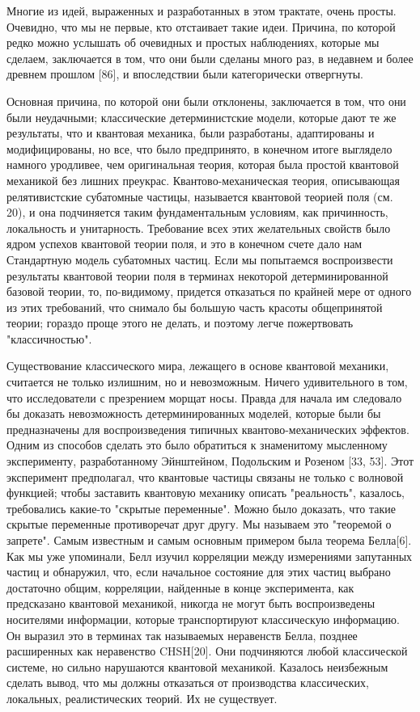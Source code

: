 \documentclass[main.tex]{subfiles}
\begin{document}
Многие из идей, выраженных и разработанных в этом трактате, очень просты. Очевидно, что мы не первые, кто отстаивает такие идеи. Причина, по которой редко можно услышать об очевидных и простых наблюдениях, которые мы сделаем, заключается в том, что они были сделаны много раз, в недавнем и более древнем прошлом [86], и впоследствии были категорически отвергнуты.

Основная причина, по которой они были отклонены, заключается в том, что они были неудачными; классические детерминистские модели, которые дают те же результаты, что и квантовая механика, были разработаны, адаптированы и модифицированы, но все, что было предпринято, в конечном итоге выглядело намного уродливее, чем оригинальная теория, которая была простой квантовой механикой без лишних преукрас. Квантово-механическая теория, описывающая релятивистские субатомные частицы, называется квантовой теорией поля (см. 20), и она подчиняется таким фундаментальным условиям, как причинность, локальность и унитарность. Требование всех этих желательных свойств было ядром успехов квантовой теории поля, и это в конечном счете дало нам Стандартную модель субатомных частиц. Если мы попытаемся воспроизвести результаты квантовой теории поля в терминах некоторой детерминированной базовой теории, то, по-видимому, придется отказаться по крайней мере от одного из этих требований, что снимало бы большую часть красоты общепринятой теории; гораздо проще этого не делать, и поэтому легче пожертвовать "классичностью". 

Существование классического мира, лежащего в основе квантовой механики, считается не только излишним, но и невозможным. Ничего удивительного в том, что исследователи с презрением морщат носы. Правда для начала им следовало бы доказать невозможность детерминированных моделей, которые были бы предназначены для воспроизведения типичных квантово-механических эффектов. Одним из способов сделать это было обратиться к знаменитому мысленному эксперименту, разработанному Эйнштейном, Подольским и Розеном [33, 53]. Этот эксперимент предполагал, что квантовые частицы связаны не только с волновой функцией; чтобы заставить квантовую механику описать "реальность", казалось, требовались какие-то "скрытые переменные". Можно было доказать, что такие скрытые переменные противоречат друг другу. Мы называем это "теоремой о запрете". Самым известным и самым основным примером была теорема Белла[6]. Как мы уже упоминали, Белл изучил корреляции между измерениями запутанных частиц и обнаружил, что, если начальное состояние для этих частиц выбрано достаточно общим, корреляции, найденные в конце эксперимента, как предсказано квантовой механикой, никогда не могут быть воспроизведены носителями информации, которые транспортируют классическую информацию. Он выразил это в терминах так называемых неравенств Белла, позднее расширенных как неравенство CHSH[20]. Они подчиняются любой классической системе, но сильно нарушаются квантовой механикой. Казалось неизбежным сделать вывод, что мы должны отказаться от производства классических, локальных, реалистических теорий. Их не существует. 
\end{document}
